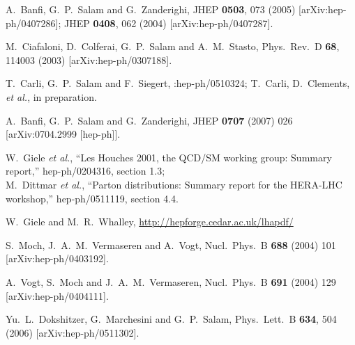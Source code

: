 \documentclass[12pt]{article}
\begin{document}
\begin{thebibliography}{99}
  A.~Banfi, G.~P.~Salam and G.~Zanderighi,
  JHEP {\bf 0503}, 073 (2005)
  [arXiv:hep-ph/0407286];
%
  JHEP {\bf 0408}, 062 (2004)
  [arXiv:hep-ph/0407287].

  M.~Ciafaloni, D.~Colferai, G.~P.~Salam and A.~M.~Stasto,
  Phys.\ Rev.\  D {\bf 68}, 114003 (2003)
  [arXiv:hep-ph/0307188].


  T.~Carli, G.~P.~Salam and F.~Siegert,
  :hep-ph/0510324;
  T.~Carli, D.~Clements, {\it et al.}, in preparation.

  A.~Banfi, G.~P.~Salam and G.~Zanderighi,
  JHEP {\bf 0707} (2007) 026
  [arXiv:0704.2999 [hep-ph]].


  W.~Giele {\it et al.},
  ``Les Houches 2001, the QCD/SM working group: Summary report,''
  hep-ph/0204316, section 1.3;\\
  M.~Dittmar {\it et al.},
  ``Parton distributions: Summary report for the HERA-LHC workshop,''
  hep-ph/0511119, section 4.4.

 W.~Giele and M.~R.~Whalley,
\url{http://hepforge.cedar.ac.uk/lhapdf/}


  S.~Moch, J.~A.~M.~Vermaseren and A.~Vogt,
  Nucl.\ Phys.\ B {\bf 688} (2004) 101
  [arXiv:hep-ph/0403192].

  A.~Vogt, S.~Moch and J.~A.~M.~Vermaseren,
  Nucl.\ Phys.\ B {\bf 691} (2004) 129
  [arXiv:hep-ph/0404111].

  Yu.~L.~Dokshitzer, G.~Marchesini and G.~P.~Salam,
  Phys.\ Lett.\  B {\bf 634}, 504 (2006)
  [arXiv:hep-ph/0511302].



\end{thebibliography}
\end{document}
